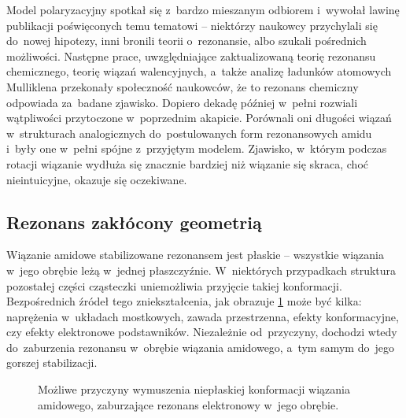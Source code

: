 Model polaryzacyjny spotkał się z~bardzo mieszanym odbiorem i~wywołał lawinę publikacji
  poświęconych temu tematowi \--- niektórzy naukowcy przychylali się do~nowej hipotezy,
  inni bronili teorii o~rezonansie, albo szukali pośrednich możliwości.
Następne prace, uwzględniające zaktualizowaną teorię rezonansu chemicznego,
  teorię wiązań walencyjnych, a~także analizę ładunków atomowych
  Mulliklena przekonały społeczność naukowców, że to rezonans chemiczny
  odpowiada za~badane zjawisko.
Dopiero dekadę później \citeauthor{kemnitz07} w~pełni rozwiali wątpliwości przytoczone
  w~poprzednim akapicie.
Porównali oni długości wiązań w~strukturach analogicznych do~postulowanych form rezonansowych
  amidu i~były one w~pełni spójne z~przyjętym modelem.
Zjawisko, w~którym podczas rotacji wiązanie  wydłuża się znacznie bardziej niż
  wiązanie  się skraca, choć nieintuicyjne, okazuje się oczekiwane. 

\subsection{Rezonans zakłócony geometrią}\label{literature:structure:geometry}
Wiązanie amidowe stabilizowane rezonansem jest płaskie \--- wszystkie wiązania w~jego obrębie
  leżą w~jednej płaszczyźnie.
W~niektórych przypadkach struktura pozostałej części cząsteczki uniemożliwia przyjęcie takiej
  konformacji.
Bezpośrednich źródeł tego zniekształcenia, jak obrazuje \cref{fig:non-planar} może być kilka:
  naprężenia w~układach mostkowych, zawada przestrzenna, efekty konformacyjne,
  czy efekty elektronowe podstawników.
Niezależnie od~przyczyny, dochodzi wtedy do~zaburzenia rezonansu w~obrębie wiązania amidowego,
  a~tym samym do~jego gorszej stabilizacji.
\begin{figure}
  
  \caption{
    Możliwe przyczyny wymuszenia niepłaskiej konformacji wiązania amidowego,
      zaburzające rezonans elektronowy w~jego obrębie.
  }
  \label{fig:non-planar}
\end{figure}

